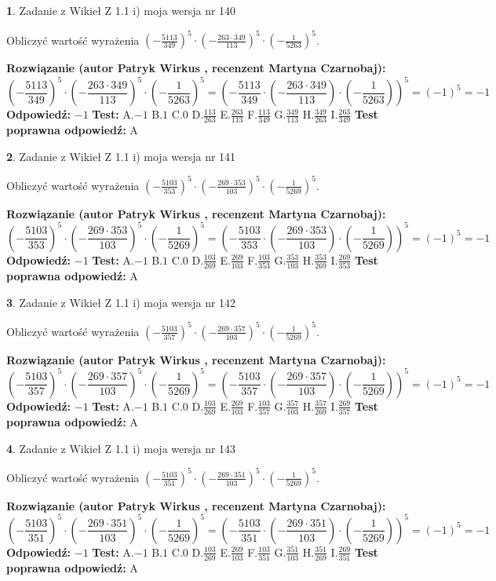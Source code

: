\documentclass[12pt, a4paper]{article}
\theoremstyle{definition} %
\newtheorem{zad}{}
\newcommand{\zadStart}[1]{\begin{zad}#1\newline}
\newcommand{\zadStop}{\end{zad}}
\newcommand{\rozwStart}[2]{\noindent \textbf{Rozwiązanie (autor #1 , recenzent #2): }\newline}
\newcommand{\rozwStop}{\newline}
\newcommand{\odpStart}{\noindent \textbf{Odpowiedź:}\newline}
\newcommand{\odpStop}{\newline}
\newcommand{\testStart}{\noindent \textbf{Test:}\newline}
\newcommand{\testStop}{\newline}
\newcommand{\kluczStart}{\noindent \textbf{Test poprawna odpowiedź:}\newline}
\newcommand{\kluczStop}{\newline}
\begin{document}
\zadStart{Zadanie z Wikieł Z 1.1 i) moja wersja nr 140}

Obliczyć wartość wyrażenia $(-\frac{5113}{349})^{5} \cdot (-\frac{263 \cdot 349}{113})^{5} \cdot (-\frac{1}{5263})^{5}$.
\zadStop
\rozwStart{Patryk Wirkus}{Martyna Czarnobaj}
$$(-\frac{5113}{349})^{5} \cdot (-\frac{263 \cdot 349}{113})^{5} \cdot (-\frac{1}{5263})^{5} = (-\frac{5113}{349} \cdot (-\frac{263 \cdot 349}{113}) \cdot (-\frac{1}{5263}))^{5} = (-1)^{5} = -1$$
\rozwStop
\odpStart
$-1$
\odpStop
\testStart
A.$-1$ B.$1$ C.$0$ D.$\frac{113}{263}$ E.$\frac{263}{113}$
F.$\frac{113}{349}$ G.$\frac{349}{113}$
H.$\frac{349}{263}$
I.$\frac{263}{349}$
\testStop
\kluczStart
A
\kluczStop



\zadStart{Zadanie z Wikieł Z 1.1 i) moja wersja nr 141}

Obliczyć wartość wyrażenia $(-\frac{5103}{353})^{5} \cdot (-\frac{269 \cdot 353}{103})^{5} \cdot (-\frac{1}{5269})^{5}$.
\zadStop
\rozwStart{Patryk Wirkus}{Martyna Czarnobaj}
$$(-\frac{5103}{353})^{5} \cdot (-\frac{269 \cdot 353}{103})^{5} \cdot (-\frac{1}{5269})^{5} = (-\frac{5103}{353} \cdot (-\frac{269 \cdot 353}{103}) \cdot (-\frac{1}{5269}))^{5} = (-1)^{5} = -1$$
\rozwStop
\odpStart
$-1$
\odpStop
\testStart
A.$-1$ B.$1$ C.$0$ D.$\frac{103}{269}$ E.$\frac{269}{103}$
F.$\frac{103}{353}$ G.$\frac{353}{103}$
H.$\frac{353}{269}$
I.$\frac{269}{353}$
\testStop
\kluczStart
A
\kluczStop



\zadStart{Zadanie z Wikieł Z 1.1 i) moja wersja nr 142}

Obliczyć wartość wyrażenia $(-\frac{5103}{357})^{5} \cdot (-\frac{269 \cdot 357}{103})^{5} \cdot (-\frac{1}{5269})^{5}$.
\zadStop
\rozwStart{Patryk Wirkus}{Martyna Czarnobaj}
$$(-\frac{5103}{357})^{5} \cdot (-\frac{269 \cdot 357}{103})^{5} \cdot (-\frac{1}{5269})^{5} = (-\frac{5103}{357} \cdot (-\frac{269 \cdot 357}{103}) \cdot (-\frac{1}{5269}))^{5} = (-1)^{5} = -1$$
\rozwStop
\odpStart
$-1$
\odpStop
\testStart
A.$-1$ B.$1$ C.$0$ D.$\frac{103}{269}$ E.$\frac{269}{103}$
F.$\frac{103}{357}$ G.$\frac{357}{103}$
H.$\frac{357}{269}$
I.$\frac{269}{357}$
\testStop
\kluczStart
A
\kluczStop



\zadStart{Zadanie z Wikieł Z 1.1 i) moja wersja nr 143}

Obliczyć wartość wyrażenia $(-\frac{5103}{351})^{5} \cdot (-\frac{269 \cdot 351}{103})^{5} \cdot (-\frac{1}{5269})^{5}$.
\zadStop
\rozwStart{Patryk Wirkus}{Martyna Czarnobaj}
$$(-\frac{5103}{351})^{5} \cdot (-\frac{269 \cdot 351}{103})^{5} \cdot (-\frac{1}{5269})^{5} = (-\frac{5103}{351} \cdot (-\frac{269 \cdot 351}{103}) \cdot (-\frac{1}{5269}))^{5} = (-1)^{5} = -1$$
\rozwStop
\odpStart
$-1$
\odpStop
\testStart
A.$-1$ B.$1$ C.$0$ D.$\frac{103}{269}$ E.$\frac{269}{103}$
F.$\frac{103}{351}$ G.$\frac{351}{103}$
H.$\frac{351}{269}$
I.$\frac{269}{351}$
\testStop
\kluczStart
A
\kluczStop
\end{document}
